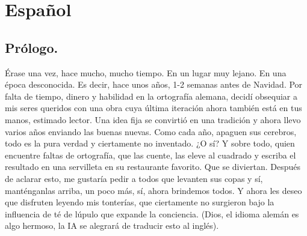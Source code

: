 \documentclass{article}
\begin{document}
\section{Español}
    \subsection{Prólogo.}
    \noindent 
    Érase una vez, hace mucho, mucho tiempo. En un lugar muy lejano. En una época
    desconocida. Es decir, hace unos años, 1-2 semanas antes de Navidad. Por falta de tiempo, dinero y habilidad en
    la
    ortografía alemana, decidí obsequiar a mis seres queridos con una obra cuya última iteración ahora también está
    en
    tus manos, estimado lector. Una idea fija se convirtió en una tradición y ahora llevo varios años enviando las
    buenas nuevas. Como cada año, apaguen sus cerebros, todo es la pura verdad y ciertamente no inventado. ¿O sí? Y
    sobre todo, quien encuentre faltas de ortografía, que las cuente, las eleve al cuadrado y escriba el resultado
    en
    una servilleta en su restaurante favorito. Que se diviertan. Después de aclarar esto, me gustaría pedir a todos
    que levanten sus copas y sí, manténganlas arriba, un poco más, sí, ahora brindemos todos. Y ahora les deseo que
    disfruten leyendo mis tonterías, que ciertamente no surgieron bajo la influencia de té de lúpulo que expande la
    conciencia. (Dios, el idioma alemán es algo hermoso, la IA se alegrará de traducir esto al inglés).\\
\end{document}
